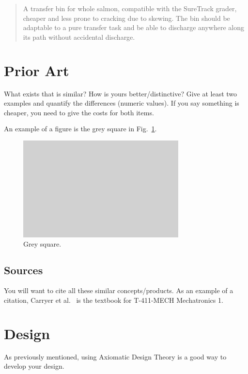 \documentclass[a4paper]{jpconf}
\begin{document}
\begin{quote} \textbf{} A transfer bin for whole salmon, compatible with the SureTrack grader, cheaper and less prone to cracking due to skewing.  
The bin should be adaptable to a pure transfer task and be able to discharge anywhere along its path without
accidental discharge.~\cite{gerhard2016suretrack}
\end{quote}


\section{Prior Art}
What exists that is similar?  How is yours better/distinctive?
Give at least two examples and quantify the differences (numeric values).
If you say something is cheaper, you need to give the costs for both items.

An example of a figure is the grey square in Fig.~\ref{fig:grey-square}.
\begin{figure}
  \centering
  \includegraphics[width=\columnwidth]{grey-square}
  \caption{Grey square.}\label{fig:grey-square}
\end{figure}



\subsection*{Sources}
You will want to cite all these similar concepts/products.
As an example of a citation, Carryer et al.~\cite{carryer2011IntroMechatronics} is the textbook for T-411-MECH Mechatronics 1.


\section{Design}
As previously mentioned, using Axiomatic Design Theory is a good way to develop your design.
\end{document}
